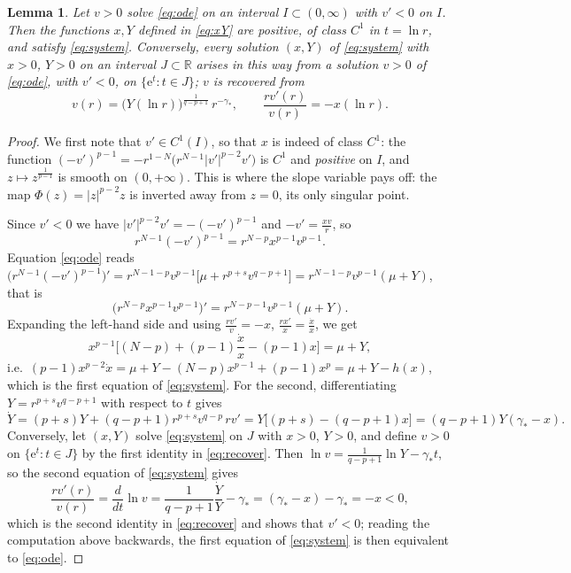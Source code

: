 \documentclass[11pt,reqno]{amsart}
\numberwithin{equation}{section}
\theoremstyle{plain}
\newtheorem{lemma}[theorem]{Lemma}
\theoremstyle{definition}
\newcommand{\R}{\mathbb{R}}
\newcommand{\gs}{\gamma_{*}}
\begin{document}
\begin{lemma}\label{lem:system}
Let $v>0$ solve \eqref{eq:ode} on an interval $I\subset(0,\infty)$ with
$v'<0$ on $I$. Then the functions $x,Y$ defined in \eqref{eq:xY} are positive,
of class $C^{1}$ in $t=\ln r$, and satisfy \eqref{eq:system}. Conversely, every
solution $(x,Y)$ of \eqref{eq:system} with $x>0$, $Y>0$ on an interval
$J\subset\R$ arises in this way from a solution $v>0$ of \eqref{eq:ode}, with
$v'<0$, on $\{\mathrm e^{t}:t\in J\}$; $v$ is recovered from
\begin{equation}\label{eq:recover}
v(r)=\big(Y(\ln r)\big)^{\frac{1}{q-p+1}}\,r^{-\gs},
\qquad
\frac{r v'(r)}{v(r)}=-x(\ln r) .
\end{equation}
\end{lemma}

\begin{proof}
We first note that $v'\in C^{1}(I)$, so that $x$ is indeed of class $C^{1}$:
the function $(-v')^{p-1}=-r^{1-N}\big(r^{N-1}|v'|^{p-2}v'\big)$ is $C^{1}$ and
\emph{positive} on $I$, and $z\mapsto z^{\frac{1}{p-1}}$ is smooth on
$(0,+\infty)$. This is where the slope variable pays off: the map
$\Phi(z)=|z|^{p-2}z$ is inverted away from $z=0$, its only singular point.

Since $v'<0$ we have $|v'|^{p-2}v'=-(-v')^{p-1}$ and $-v'=\frac{x v}{r}$, so
\[
r^{N-1}(-v')^{p-1}=r^{N-p}x^{p-1}v^{p-1}.
\]
Equation \eqref{eq:ode} reads
$\big(r^{N-1}(-v')^{p-1}\big)'=r^{N-1-p}v^{p-1}\big[\mu+r^{p+s}v^{q-p+1}\big]
=r^{N-1-p}v^{p-1}(\mu+Y)$, that is
\[
\big(r^{N-p}x^{p-1}v^{p-1}\big)'=r^{N-p-1}v^{p-1}(\mu+Y).
\]
Expanding the left-hand side and using $\frac{rv'}{v}=-x$,
$\frac{r x'}{x}=\frac{\dot x}{x}$, we get
\[
x^{p-1}\Big[(N-p)+(p-1)\frac{\dot x}{x}-(p-1)x\Big]=\mu+Y ,
\]
i.e.\ $(p-1)x^{p-2}\dot x=\mu+Y-(N-p)x^{p-1}+(p-1)x^{p}=\mu+Y-h(x)$, which is
the first equation of \eqref{eq:system}. For the second, differentiating
$Y=r^{p+s}v^{q-p+1}$ with respect to $t$ gives
\[
\dot Y=(p+s)Y+(q-p+1)r^{p+s}v^{q-p}\,r v'
=Y\big[(p+s)-(q-p+1)x\big]=(q-p+1)Y(\gs-x).
\]
Conversely, let $(x,Y)$ solve \eqref{eq:system} on $J$ with $x>0$, $Y>0$, and
define $v>0$ on $\{\mathrm e^{t}:t\in J\}$ by the first identity in
\eqref{eq:recover}. Then $\ln v=\frac{1}{q-p+1}\ln Y-\gs t$, so the second
equation of \eqref{eq:system} gives
\[
\frac{r v'(r)}{v(r)}=\frac{d}{dt}\ln v
=\frac{1}{q-p+1}\frac{\dot Y}{Y}-\gs=(\gs-x)-\gs=-x<0 ,
\]
which is the second identity in \eqref{eq:recover} and shows that $v'<0$;
reading the computation above backwards, the first equation of
\eqref{eq:system} is then equivalent to \eqref{eq:ode}.
\end{proof}
\end{document}
